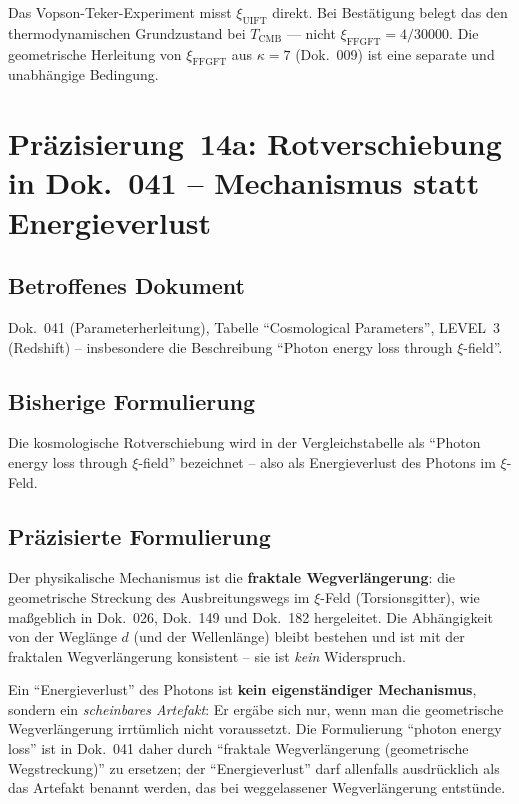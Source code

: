 Das Vopson-Teker-Experiment misst $\xi_\text{UIFT}$ direkt.
Bei Bestätigung belegt das den thermodynamischen Grundzustand bei $T_\text{CMB}$ —
nicht $\xi_\text{FFGFT} = 4/30000$.
Die geometrische Herleitung von $\xi_\text{FFGFT}$ aus $\kappa = 7$ (Dok.~009)
ist eine separate und unabhängige Bedingung.


\section{\texorpdfstring{Präzisierung~14a: Rotverschiebung in Dok.~041 -- Mechanismus statt Energieverlust}{Praezisierung 14a: Rotverschiebung in Dok. 041 -- Mechanismus statt Energieverlust}}

\subsection*{Betroffenes Dokument}

Dok.~041 (Parameterherleitung), Tabelle \enquote{Cosmological Parameters},
LEVEL~3 (Redshift) -- insbesondere die Beschreibung
\enquote{Photon energy loss through $\xi$-field}.

\subsection*{Bisherige Formulierung}

Die kosmologische Rotverschiebung wird in der Vergleichstabelle als
\enquote{Photon energy loss through $\xi$-field} bezeichnet -- also als
Energieverlust des Photons im $\xi$-Feld.

\subsection*{Präzisierte Formulierung}

Der physikalische Mechanismus ist die \textbf{fraktale Wegverlängerung}:
die geometrische Streckung des Ausbreitungswegs im $\xi$-Feld
(Torsionsgitter), wie maßgeblich in Dok.~026, Dok.~149 und Dok.~182
hergeleitet. Die Abhängigkeit von der Weglänge $d$ (und der Wellenlänge)
bleibt bestehen und ist mit der fraktalen Wegverlängerung konsistent --
sie ist \emph{kein} Widerspruch.

Ein \enquote{Energieverlust} des Photons ist \textbf{kein eigenständiger
Mechanismus}, sondern ein \emph{scheinbares Artefakt}: Er ergäbe sich nur,
wenn man die geometrische Wegverlängerung irrtümlich nicht voraussetzt.
Die Formulierung \enquote{photon energy loss} ist in Dok.~041 daher durch
\enquote{fraktale Wegverlängerung (geometrische Wegstreckung)} zu ersetzen;
der \enquote{Energieverlust} darf allenfalls ausdrücklich als das Artefakt
benannt werden, das bei weggelassener Wegverlängerung entstünde.

